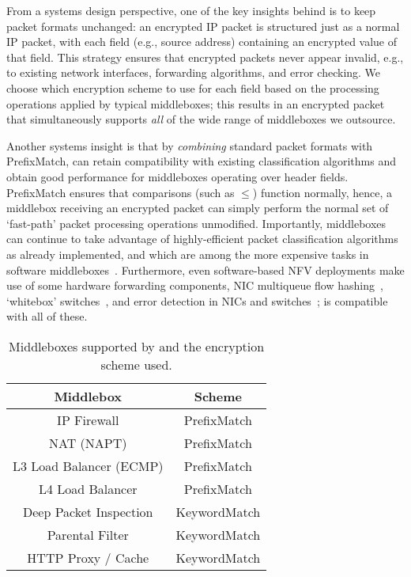   From a systems design perspective, one of the key insights behind \sys is to keep packet formats unchanged: an encrypted IP packet is structured just as a normal IP packet, with each field (e.g., source address) containing an encrypted value of that field.
  This strategy ensures that encrypted packets never appear invalid, e.g., to existing network interfaces, forwarding algorithms, and error checking. 
  We choose which encryption scheme to use for each field based on the processing operations applied by typical middleboxes; this results in an encrypted packet that simultaneously supports {\it all} of the wide range of middleboxes we outsource.
  
  Another systems insight is that by {\it combining} standard packet formats with PrefixMatch, \sys can retain compatibility with existing classification algorithms and obtain good performance for middleboxes operating over header fields.
  PrefixMatch ensures that comparisons (such as $\leq$) function normally, hence, a middlebox receiving an encrypted packet can simply perform the normal set of `fast-path' packet processing operations unmodified.
  Importantly, middleboxes can continue to take advantage of highly-efficient packet classification algorithms~\cite{packet_classif} as already implemented, and which are among the more expensive tasks in software middleboxes~\cite{comb, ethan-paper}.
  Furthermore, even software-based NFV deployments make use of some hardware forwarding components, \eg{} NIC multiqueue flow hashing~\cite{nicdocument}, `whitebox' switches~\cite{whitebox}, and error detection in NICs and switches~\cite{nicdocument, ciscov6}; \sys is compatible with all of these.
  
 
 \begin{table}[t]
\centering
\small
\hspace{-2pt}
\begin{tabular}{c|c}
\hline
{\bf Middlebox} &  {\bf Scheme} \\ \hline
IP Firewall & 
 PrefixMatch \\ 

NAT (NAPT) & 
 PrefixMatch \\

L3 Load Balancer (ECMP) &
 PrefixMatch \\ 

L4 Load Balancer &
 PrefixMatch \\ 

Deep Packet Inspection &

KeywordMatch \\ 

Parental Filter &

KeywordMatch \\ 

HTTP Proxy / Cache &

KeywordMatch \\ 

\end{tabular}
\caption[]{Middleboxes supported by \sys and the encryption scheme used.\label{tbl:mbreqs}} 
\end{table}



